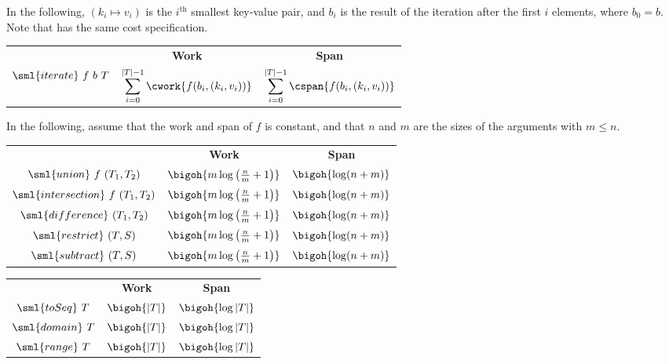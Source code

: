 \begin{cluster}
\label{grp:cst:treap-table::iteration}

\begin{costspec}[Iteration]
\label{cst:treap-table::iteration}
In the following, $(k_i \mapsto v_i)$ is the $i^\text{th}$ smallest key-value
pair, and $b_i$ is the result of the iteration after the first $i$ elements,
where $b_0 = b$. Note that  has the same cost specification.
\begin{tabular}{c|c|c}
& \textbf{Work} & \textbf{Span} \\
$\sml{iterate}~f~b~T$ &
$\displaystyle\sum_{i=0}^{|T|-1} \cwork{f(b_i, (k_i, v_i))}$ &
$\displaystyle\sum_{i=0}^{|T|-1} \cspan{f(b_i, (k_i, v_i))}$
\end{tabular}

\end{costspec}
\end{cluster}

\begin{cluster}
\label{grp:cst:treap-table::combination}

\begin{costspec}[Combination]
\label{cst:treap-table::combination}
In the following, assume that the work and span of $f$ is constant, and that
$n$ and $m$ are the sizes of the arguments with $m \leq n$.
\begin{tabular}{c|c|c}
& \textbf{Work} & \textbf{Span} \\
$\sml{union}~f~(T_1, T_2)$ &
$\bigoh{m \log\left(\frac n m + 1\right)}$ &
$\bigoh{\log(n + m)}$
\\
$\sml{intersection}~f~(T_1, T_2)$ &
$\bigoh{m \log\left(\frac n m + 1\right)}$ &
$\bigoh{\log(n + m)}$
\\
$\sml{difference}~(T_1, T_2)$ &
$\bigoh{m \log\left(\frac n m + 1\right)}$ &
$\bigoh{\log(n + m)}$
\\
$\sml{restrict}~(T, S)$ &
$\bigoh{m \log\left(\frac n m + 1\right)}$ &
$\bigoh{\log(n + m)}$
\\
$\sml{subtract}~(T, S)$ &
$\bigoh{m \log\left(\frac n m + 1\right)}$ &
$\bigoh{\log(n + m)}$
\end{tabular}

\end{costspec}
\end{cluster}

\begin{cluster}
\label{grp:cst:treap-table::miscellaneous}

\begin{costspec}[Miscellaneous]
\label{cst:treap-table::miscellaneous}
\begin{tabular}{c|c|c}
& \textbf{Work} & \textbf{Span} \\
$\sml{toSeq}~T$ & $\bigoh{|T|}$ & $\bigoh{\log|T|}$ \\
$\sml{domain}~T$ & $\bigoh{|T|}$ & $\bigoh{\log|T|}$ \\
$\sml{range}~T$ & $\bigoh{|T|}$ & $\bigoh{\log|T|}$
\end{tabular}

\end{costspec}
\end{cluster}

